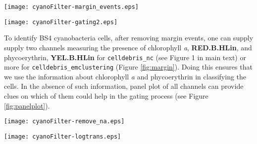 \documentclass[9pt]{extarticle}
\begin{document}
\begin{figure*}[h!]

	\begin{minipage}[b]{0.5\textwidth}
		\texttt{[image: cyanoFilter-margin\_events.eps]}
	\end{minipage}
	\qquad
	\begin{minipage}[b]{0.5\textwidth}
		\texttt{[image: cyanoFilter-gating2.eps]}
	\end{minipage}
	
	\caption{\label{fig:margin} \textbf{Left}: Smoothed Scatterplot of measured width (\textbf{SSC.W}) and height (\textbf{FSC.HLin}). The red line is the estimated cut point differentiating margin events from properly measured particles. Every particle below the red line has their width properly measured. \textbf{Right}: Smoothed scatterplot of all channels used for gating. The plot is generated by assigning points to each cluster if their chance of belonging to that cluster is atleast 80\%. Each colour represents a cluster, and  the boundaries of the cluster with the highest number of particles is drawn with red dotted lines.}
\end{figure*}

To identify BS4 cyanobacteria cells, after removing margin events, one can supply supply two channels measuring the presence of chlorophyll \emph{a}, \textbf{RED.B.HLin}, and phycoerythrin, \textbf{YEL.B.HLin} for \texttt{celldebris\_nc} (see Figure 1 in main text) or more for \texttt{celldebris\_emclustering} (Figure \ref{fig:margin}). Doing this ensures that we use the information about chlorophyll \emph{a} and phycoerythrin in classifying the cells. In the absence of such information, panel plot of all channels can provide clues on which of them could help in the gating process (see Figure \ref{fig:panelplot}). 

\begin{figure*}[h!]
	
	\begin{minipage}[b]{0.5\textwidth}
		\texttt{[image: cyanoFilter-remove\_na.eps]}
	\end{minipage}
	\qquad
	\begin{minipage}[b]{0.5\textwidth}
		\texttt{[image: cyanoFilter-logtrans.eps]}
	\end{minipage}
	
	\caption{\label{fig:panelplot} \textbf{Left}: Panel plot for all channels measured. \textbf{Right}: Panel plot for all measured channels after log transformation}
\end{figure*}
\end{document}
